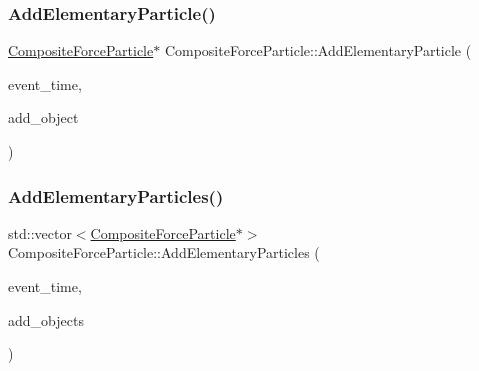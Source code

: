 \subsubsection{\texorpdfstring{Add\+Elementary\+Particle()}{AddElementaryParticle()}}
{\footnotesize\ttfamily \mbox{\hyperlink{class_composite_force_particle}{Composite\+Force\+Particle}}$\ast$ Composite\+Force\+Particle\+::\+Add\+Elementary\+Particle (\begin{DoxyParamCaption}\item[{std\+::chrono\+::time\+\_\+point$<$ \mbox{\hyperlink{universe_8h_a0ef8d951d1ca5ab3cfaf7ab4c7a6fd80}{Clock}} $>$}]{event\+\_\+time,  }\item[{\mbox{\hyperlink{class_composite_force_particle}{Composite\+Force\+Particle}} $\ast$}]{add\+\_\+object }\end{DoxyParamCaption})}

\mbox{\label{class_composite_force_particle_a2b88f000067b5d430d1850e75b733f56}} 
\subsubsection{\texorpdfstring{Add\+Elementary\+Particles()}{AddElementaryParticles()}}
{\footnotesize\ttfamily std\+::vector$<$\mbox{\hyperlink{class_composite_force_particle}{Composite\+Force\+Particle}}$\ast$$>$ Composite\+Force\+Particle\+::\+Add\+Elementary\+Particles (\begin{DoxyParamCaption}\item[{std\+::chrono\+::time\+\_\+point$<$ \mbox{\hyperlink{universe_8h_a0ef8d951d1ca5ab3cfaf7ab4c7a6fd80}{Clock}} $>$}]{event\+\_\+time,  }\item[{std\+::vector$<$ \mbox{\hyperlink{class_composite_force_particle}{Composite\+Force\+Particle}} $\ast$$>$}]{add\+\_\+objects }\end{DoxyParamCaption})}

\mbox{\label{class_composite_force_particle_afa4dc18258722b3c85fbc9789a4297a5}} 

